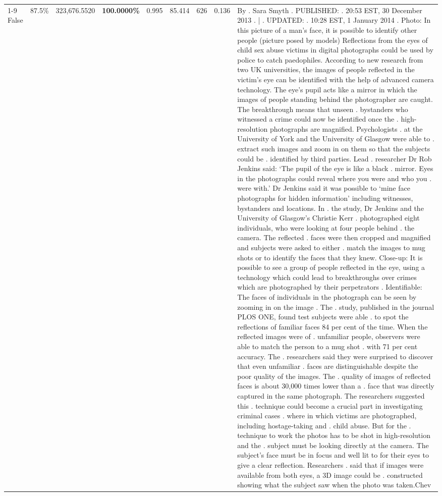\begin{table}[H]
\begin{tabular}{lllrlllll}
\cline{1-9} \cline{2-9}
False & 87.5\% & 323,676.5520 & \bfseries \color{red} 100.0000\% & 0.995 & 85.414 & 626 & 0.136 & By . Sara Smyth . PUBLISHED: . 20:53 EST, 30 December 2013 . | . UPDATED: . 10:28 EST, 1 January 2014 . Photo: In this picture of a man's face, it is possible to identify other people (picture posed by models) Reflections from the eyes of child sex abuse victims in digital photographs could be used by police to catch paedophiles. According to new research from two UK universities, the images of people reflected in the victim's eye can be identified with the help of advanced camera technology. The eye's pupil acts like a mirror in which the images of people standing behind the photographer are caught. The breakthrough means that unseen . bystanders who witnessed a crime could now be identified once the . high-resolution photographs are magnified. Psychologists . at the University of York and the University of Glasgow were able to . extract such images and zoom in on them so that the subjects could be . identified by third parties. Lead . researcher Dr Rob Jenkins said: ‘The pupil of the eye is like a black . mirror. Eyes in the photographs could reveal where you were and who you . were with.' Dr Jenkins said it was possible to ‘mine face photographs for hidden information' including witnesses, bystanders and locations. In . the study, Dr Jenkins and the University of Glasgow's Christie Kerr . photographed eight individuals, who were looking at four people behind . the camera. The reflected . faces were then cropped and magnified and subjects were asked to either . match the images to mug shots or to identify the faces that they knew. Close-up: It is possible to see a group of people reflected in the eye, using a technology which could lead to breakthroughs over crimes which are photographed by their perpetrators . Identifiable: The faces of individuals in the photograph can be seen by zooming in on the image . The . study, published in the journal PLOS ONE, found test subjects were able . to spot the reflections of familiar faces 84 per cent of the time. When the reflected images were of . unfamiliar people, observers were able to match the person to a mug shot . with 71 per cent accuracy. The . researchers said they were surprised to discover that even unfamiliar . faces are distinguishable despite the poor quality of the images. The . quality of images of reflected faces is about 30,000 times lower than a . face that was directly captured in the same photograph. The researchers suggested this . technique could become a crucial part in investigating criminal cases . where in which victims are photographed, including hostage-taking and . child abuse. But for the . technique to work the photos has to be shot in high-resolution and the . subject must be looking directly at the camera. The subject's face must be in focus and well lit to for their eyes to give a clear reflection. Researchers . said that if images were available from both eyes, a 3D image could be . constructed showing what the subject saw when the photo was taken.Chev \\

\end{tabular}
\end{table}
